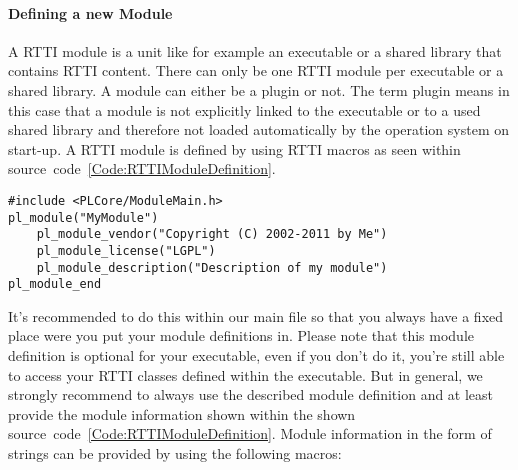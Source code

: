 \paragraph{Defining a new Module}
A RTTI module is a unit like for example an executable or a shared library that contains RTTI content. There can only be one RTTI module per executable or a shared library. A module can either be a plugin or not. The term plugin means in this case that a module is not explicitly linked to the executable or to a used shared library and therefore not loaded automatically by the operation system on start-up. A RTTI module is defined by using RTTI macros as seen within source~code~\ref{Code:RTTIModuleDefinition}.
\begin{lstlisting}[float=htb,label=Code:RTTIModuleDefinition,caption={Defining a new RTTI module}]
#include <PLCore/ModuleMain.h>
pl_module("MyModule")
	pl_module_vendor("Copyright (C) 2002-2011 by Me")
	pl_module_license("LGPL")
	pl_module_description("Description of my module")
pl_module_end
\end{lstlisting}
It's recommended to do this within our main file so that you always have a fixed place were you put your module definitions in. Please note that this module definition is optional for your executable, even if you don't do it, you're still able to access your RTTI classes defined within the executable. But in general, we strongly recommend to always use the described module definition and at least provide the module information shown within the shown source~code~\ref{Code:RTTIModuleDefinition}. Module information in the form of strings can be provided by using the following macros:
